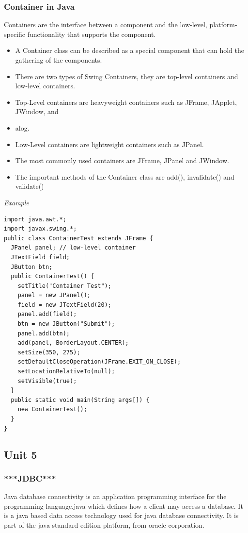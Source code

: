 \documentclass[twocolumn, a4paper]{article}
\begin{document}
\section{Container in Java}
Containers are the interface between a component and the low-level,
platform-specific functionality that supports the component.
\begin{itemize}
  \item A Container class can be described as a special component that can hold the gathering of the components.
  \item There are two types of Swing Containers, they are top-level containers and low-level containers.
  \item Top-Level containers are heavyweight containers such as JFrame, JApplet, JWindow, and
  \item alog.
  \item Low-Level containers are lightweight containers such as JPanel.
  \item The most commonly used containers are JFrame, JPanel and JWindow.
  \item The important methods of the Container class are add(), invalidate() and validate()
\end{itemize}

\vskip10pt
\noindent\emph{Example}
\begin{lstlisting}
import java.awt.*;
import javax.swing.*;
public class ContainerTest extends JFrame {
  JPanel panel; // low-level container
  JTextField field;
  JButton btn;
  public ContainerTest() {
    setTitle("Container Test");
    panel = new JPanel();
    field = new JTextField(20);
    panel.add(field);
    btn = new JButton("Submit");
    panel.add(btn);
    add(panel, BorderLayout.CENTER);
    setSize(350, 275);
    setDefaultCloseOperation(JFrame.EXIT_ON_CLOSE);
    setLocationRelativeTo(null);
    setVisible(true);
  }
  public static void main(String args[]) {
    new ContainerTest();
  }
}
\end{lstlisting}

\begin{tcolorbox}%
  \part{Unit 5}
\end{tcolorbox}
\section{***JDBC***}
Java database connectivity is an application programming interface for the
programming language.java which defines how a client may access a database. It
is a java based data access technology used for java database connectivity. It
is part of the java standard edition platform, from oracle corporation.
\end{document}
